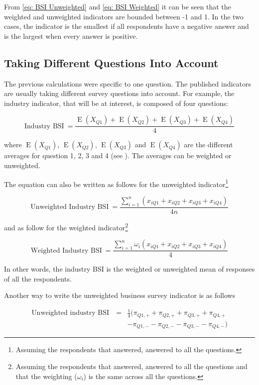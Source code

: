 \documentclass[12pt,a4paper,oneside]{book}
\DeclareMathOperator{\E}{E}
\begin{document}
From \autoref{eq: BSI Unweighted} and \ref{eq: BSI Weighted} it can be seen that the weighted and unweighted indicators are bounded between -1 and 1. In the two cases, the indicator is the smallest if all respondents have a negative answer and is the largest when every answer is positive.

\subsection{Taking Different Questions Into Account}

The previous calculations were specific to one question. The published indicators are usually taking different survey questions into account. For example, the industry indicator, that will be at interest, is composed of four questions:

\begin{equation}
    \mbox{Industry BSI}\ = \frac{\E(X_{Q1}) + \E(X_{Q2}) + \E(X_{Q3}) + \E(X_{Q4})}{4}
\end{equation}

where 
$\E(X_{Q1})$, $\E(X_{Q2})$, $\E(X_{Q3})$ and $\E(X_{Q4})$ are the different averages for question 1, 2, 3 and 4 (see ). The averages can be weighted or unweighted.

The equation can also be written as follows for the unweighted indicator\footnote{Assuming the respondents that answered, answered to all the questions.}

\begin{equation}
    \mbox{Unweighted Industry BSI}\ = \frac{\sum^n_{i=1}(x_{iQ1} + x_{iQ2} + x_{iQ3} + x_{iQ4})}{4n} 
\end{equation} 

and as follow for the weighted indicator\footnote{Assuming the respondents that answered, answered to all the questions and that the weighting ($\omega_i$) is the same across all the questions.}

\begin{equation}
    \mbox{Weighted Industry BSI}\ = \frac{\sum^n_{i=1} \omega_i (x_{iQ1} + x_{iQ2} + x_{iQ3} + x_{iQ4})}{4} 
\end{equation} 

In other words, the industry BSI is the weighted or unweighted mean of responses of all the respondents.

Another way to write the unweighted business survey indicator is as follows

\begin{eqnarray}
    \mbox{Unweighted industry BSI}\ &=& \frac{1}{4} \big( \pi_{Q1,+} + \pi_{Q2,+} + \pi_{Q3,+} + \pi_{Q4,+} \nonumber \\
    && - \pi_{Q1,-} - \pi_{Q2,-} - \pi_{Q3,-} - \pi_{Q4,-} \big)
\end{eqnarray}
\end{document}
